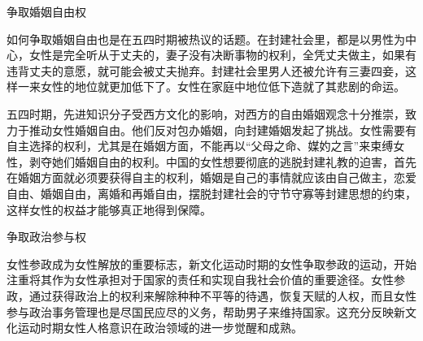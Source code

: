 \begin{frame}{争取婚姻自由权}
    \begin{block}{}
        如何争取婚姻自由也是在五四时期被热议的话题。在封建社会里，都是以男性为中心，女性是完全听从于丈夫的，妻子没有决断事物的权利，全凭丈夫做主，如果有违背丈夫的意愿，就可能会被丈夫抛弃。封建社会里男人还被允许有三妻四妾，这样一来女性的地位就更加低下了。女性在家庭中地位低下造就了其悲剧的命运。

        五四时期，先进知识分子受西方文化的影响，对西方的自由婚姻观念十分推崇，致力于推动女性婚姻自由。他们反对包办婚姻，向封建婚姻发起了挑战。女性需要有自主选择的权利，尤其是在婚姻方面，不能再以“父母之命、媒妁之言”来束缚女性，剥夺她们婚姻自由的权利。中国的女性想要彻底的逃脱封建礼教的迫害，首先在婚姻方面就必须要获得自主的权利，婚姻是自己的事情就应该由自己做主，恋爱自由、婚姻自由，离婚和再婚自由，摆脱封建社会的守节守寡等封建思想的约束，这样女性的权益才能够真正地得到保障。
    \end{block}
\end{frame}

\begin{frame}{争取政治参与权}
    \begin{block}{}
        女性参政成为女性解放的重要标志，新文化运动时期的女性争取参政的运动，开始注重将其作为女性承担对于国家的责任和实现自我社会价值的重要途径。女性参政，通过获得政治上的权利来解除种种不平等的待遇，恢复天赋的人权，而且女性参与政治事务管理也是尽国民应尽的义务，帮助男子来维持国家。这充分反映新文化运动时期女性人格意识在政治领域的进一步觉醒和成熟。
    \end{block}
\end{frame}
